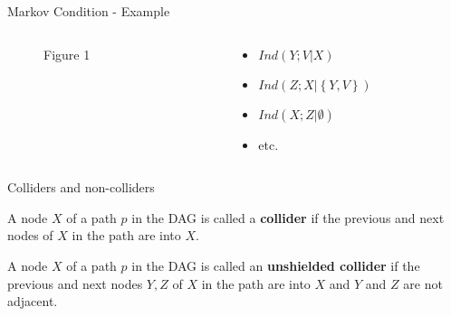 \documentclass[english, compress, red]{beamer}
\begin{document}
\begin{frame}{Markov Condition - Example}
	\begin{columns}
		\begin{column}{0.6\textwidth}
			\begin{figure}
   \caption{Figure 1}
   \end{figure}
   \end{column}
   \begin{column}{0.4\textwidth}	
    \begin{itemize}
    	\item $Ind(Y;V|X)$
    	\item $Ind(Z;X | \left\{Y,V \right\})$
    	\item $Ind(X;Z | \emptyset)$
    	\item etc.
    \end{itemize}
    \end{column}
    \end{columns}
\end{frame}

\begin{frame}{Colliders and non-colliders}
	\begin{definition}A node $X$ of a path $p$ in the DAG is called a \textbf{collider} if the previous and next nodes of $X$ in the path are into $X$.
	\end{definition}

    \begin{definition}
    	A node $X$ of a path $p$ in the DAG is called an \textbf{unshielded collider} if the previous and next nodes $Y,Z$ of $X$ in the path are into $X$ and $Y$ and $Z$ are not adjacent.
    \end{definition}
\end{frame}
\end{document}
